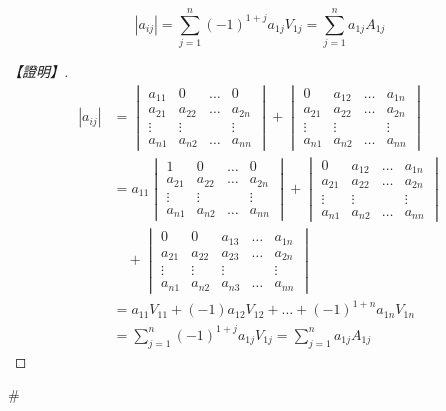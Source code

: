 \begin{theorem}\label{thm:b6s-1-15}
\[ |a_{ij}| = \sum_{j=1}^n (-1)^{1+j} a_{1j} V_{1j} = \sum_{j=1}^n a_{1j} A_{1j} \]
\end{theorem}

\begin{proof}[【證明】]
\begin{align*}
|a_{ij}| &= \begin{vmatrix}
a_{11} & 0 & \dots & 0 \\
a_{21} & a_{22} & \dots & a_{2n} \\
\vdots & \vdots & & \vdots \\
a_{n1} & a_{n2} & \dots & a_{nn}
\end{vmatrix} + \begin{vmatrix}
0 & a_{12} & \dots & a_{1n} \\
a_{21} & a_{22} & \dots & a_{2n} \\
\vdots & \vdots & & \vdots \\
a_{n1} & a_{n2} & \dots & a_{nn}
\end{vmatrix} \\
&= a_{11} \begin{vmatrix}
1 & 0 & \dots & 0 \\
a_{21} & a_{22} & \dots & a_{2n} \\
\vdots & \vdots & & \vdots \\
a_{n1} & a_{n2} & \dots & a_{nn}
\end{vmatrix} + \begin{vmatrix}
0 & a_{12} & \dots & a_{1n} \\
a_{21} & a_{22} & \dots & a_{2n} \\
\vdots & \vdots & & \vdots \\
a_{n1} & a_{n2} & \dots & a_{nn}
\end{vmatrix} \\
&\quad + \begin{vmatrix}
0 & 0 & a_{13} & \dots & a_{1n} \\
a_{21} & a_{22} & a_{23} & \dots & a_{2n} \\
\vdots & \vdots & \vdots & & \vdots \\
a_{n1} & a_{n2} & a_{n3} & \dots & a_{nn}
\end{vmatrix} \\
&= a_{11} V_{11} + (-1) a_{12} V_{12} + \dots + (-1)^{1+n} a_{1n} V_{1n} \\
&= \sum_{j=1}^n (-1)^{1+j} a_{1j} V_{1j} = \sum_{j=1}^n a_{1j} A_{1j}
\end{align*}
\end{proof}\hfill$\#$

